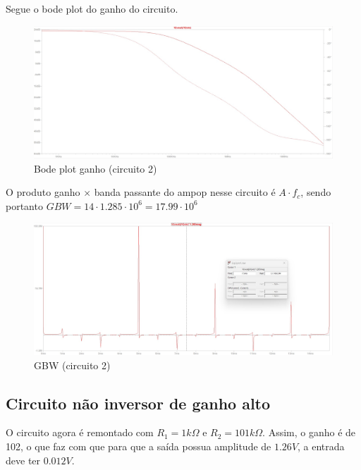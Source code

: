 \documentclass[10pt,twocolumn,letterpaper]{article}
\begin{document}
\newpage
Segue o bode plot do ganho do circuito.

\begin{figure}[h]
\caption{Bode plot ganho (circuito 2)}
\begin{center}
\includegraphics[scale=0.15]{figuras/fig9}
\end{center}
\end{figure}

O produto ganho $\times$ banda passante do ampop nesse circuito é $A\cdot f_c$, sendo portanto $GBW = 14\cdot1.285\cdot10^6=17.99\cdot10^6$

\begin{figure}[h]
\caption{GBW (circuito 2)}
\begin{center}
\includegraphics[scale=0.15]{figuras/fig10}
\end{center}
\end{figure}

\subsection{Circuito não inversor de ganho alto}

O circuito agora é remontado com $R_1=1k\Omega$ e $R_2=101k\Omega$. Assim, o ganho é de 102, o que faz com que para que a saída possua amplitude de $1.26V$, a entrada deve ter $0.012V$.
\newpage
\end{document}
